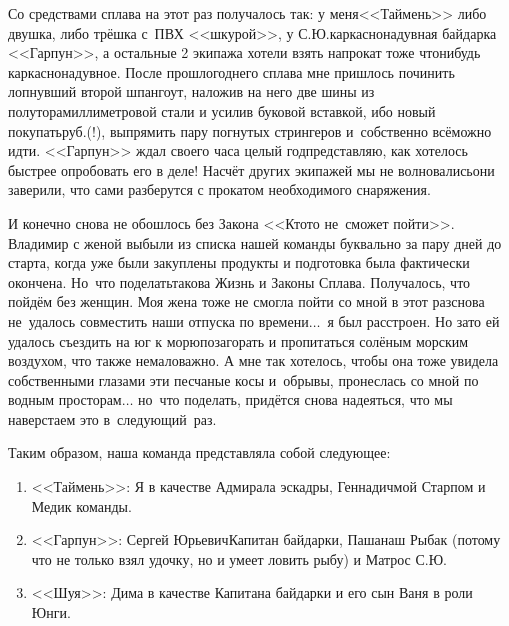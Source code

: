 Со средствами сплава на этот раз получалось так: у меня\mdash <<Таймень>> либо двушка, либо трёшка с~ПВХ <<шкурой>>, у С.Ю.\mdash каркасно\sdash надувная байдарка <<Гарпун>>, а остальные 2 экипажа хотели взять напрокат тоже что\sdash нибудь каркасно\sdash надувное. После прошлогоднего сплава мне пришлось починить лопнувший второй шпангоут, наложив на него две шины из полуторамиллиметровой стали и усилив буковой вставкой, ибо новый покупать\thinspace руб.(!), выпрямить пару погнутых стрингеров и~собственно всё\mdash можно идти. <<Гарпун>> ждал своего часа целый год\mdash представляю, как хотелось быстрее опробовать его в деле! Насчёт других экипажей мы не волновались\mdash они заверили, что сами разберутся с прокатом необходимого снаряжения. 

И конечно снова не обошлось без Закона <<Кто\sdash то не~сможет пойти>>. Владимир с женой выбыли из списка нашей команды буквально за пару дней до старта, когда уже были закуплены продукты и подготовка была фактически окончена. Но~что поделать\mdash такова Жизнь и Законы Сплава. Получалось, что пойдём без женщин. Моя жена тоже не смогла пойти со мной в этот раз\mdash снова не~удалось совместить наши отпуска по времени$\ldots$~я был расстроен. Но зато ей удалось съездить на юг к морю\mdash позагорать и пропитаться солёным морским воздухом, что также немаловажно. А мне так хотелось, чтобы она тоже увидела собственными глазами эти песчаные косы и~обрывы, пронеслась со мной по водным просторам$\ldots$ но~что поделать, придётся снова надеяться, что мы наверстаем это в~следующий~раз. 

Таким образом, наша команда представляла собой следующее:
\vspace{-3mm}
\begin{enumerate}
	\item <<Таймень>>: Я в качестве Адмирала эскадры, Геннадич\mdash мой Старпом и Медик команды.
	\item <<Гарпун>>: Сергей Юрьевич\mdash  Капитан байдарки, Паша\mdash наш Рыбак (потому что не только взял удочку, но и умеет ловить рыбу) и Матрос С.Ю.
	\item <<Шуя>>: Дима в качестве Капитана байдарки и его сын Ваня в роли Юнги.
\end{enumerate}


\begin{center}
\end{center}
